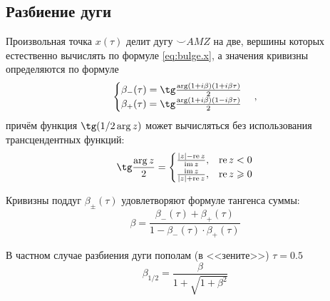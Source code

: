 \subsection*{Разбиение дуги}

Произвольная точка
$x(\tau)$
делит дугу
${\smile}AMZ$
на две,
вершины которых естественно вычислять по формуле
\eqref{eq:bulge.x},
а значения кривизны определяются по формуле
$$
\begin{cases}
  \beta_{-}(\tau)= \tg \frac{\arg (1+i\beta)(1+i\beta\tau)}2
  \\
  \beta_{+}(\tau)= \tg \frac{\arg (1+i\beta)(1-i\beta\tau)}2
  \end{cases}
  ,
$$
причём функция
$\tg(1/2\arg z)$
может вычисляться без использования
трансцендентных функций:
\begin{equation}
  \label{eq:bulge.tgq}
  \tg \frac{\arg z}2 =
  \begin{cases}
    \frac{|z|-\operatorname{re} z}{\operatorname{im} z}, & \operatorname{re} z < 0
    \\
    \frac{\operatorname{im} z}{|z|+\operatorname{re} z}, & \operatorname{re} z \geqslant 0
  \end{cases}
\end{equation}

Кривизны поддуг
$\beta_{\pm}(\tau)$
удовлетворяют формуле тангенса суммы:
$$
\beta = \frac{\beta_{-}(\tau)+\beta_{+}(\tau)}{1-\beta_{-}(\tau)\cdot\beta_{+}(\tau)}
$$

В частном случае разбиения дуги пополам
(в <<зените>>)
$\tau=0.5$
$$
\beta_{1/2}=
  \frac{\beta}{1+\sqrt{1+\beta^2}}
$$
